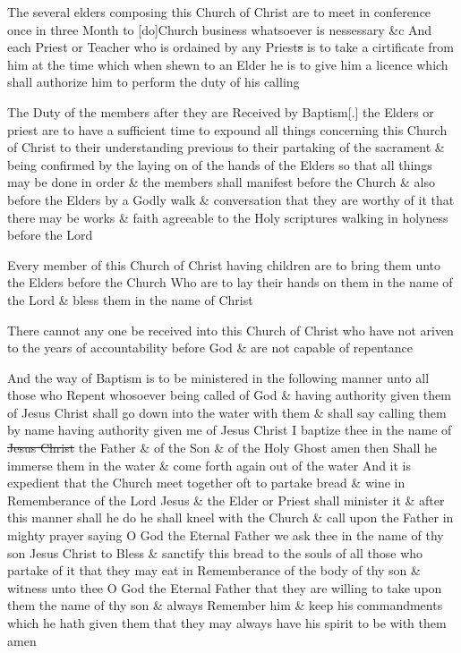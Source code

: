 		The several elders composing this Church of Christ are to meet in conference once in three Month to [do]Church business whatsoever is nessessary \&c And each Priest or Teacher who is ordained by any Priest\sout{s} is to take a cirtificate from him at the time which when shewn to an Elder he is to give him a licence which shall authorize him to perform the duty of his calling

		The Duty of the members after they are Received by Baptism[.] the Elders or priest are to have a sufficient time to expound all things concerning this Church of Christ to their understanding previous to their partaking of the sacrament \& being confirmed by the laying on of the hands of the Elders so that all things may be done in order \& the members shall manifest before the Church \& also before the Elders by a Godly walk \& conversation that they are worthy of it that there may be works \& faith agreeable to the Holy scriptures walking in holyness before the Lord

		Every member of this Church of Christ having children are to bring them unto the Elders before the Church Who are to lay their hands on them in the name of the Lord \& bless them in the name of Christ

		There cannot any one be received into this Church of Christ who have not ariven to the years of accountability before God \& are not capable of repentance

		And the way of Baptism is to be ministered in the following manner unto all those who Repent whosoever being called of God \& having authority given them of Jesus Christ shall go down into the water with them \& shall say calling them by name having authority given me of Jesus Christ I baptize thee in the name of \sout{Jesus Christ} the Father \& of the Son \& of the Holy Ghost amen then Shall he immerse them in the water \& come forth again out of the water And it is expedient that the Church meet together oft to partake bread \& wine in Rememberance of the Lord Jesus \& the Elder or Priest shall minister it \& after this manner shall he do he shall kneel with the Church \& call upon the Father in mighty prayer saying O God the Eternal Father we ask thee in the name of thy son Jesus Christ to Bless \& sanctify this bread to the souls of all those who partake of it that they may eat in Rememberance of the body of thy son \& witness unto thee O God the Eternal Father that they are willing to take upon them the name of thy son \& always Remember him \& keep his commandments which he hath given them that they may always have his spirit to be with them amen

